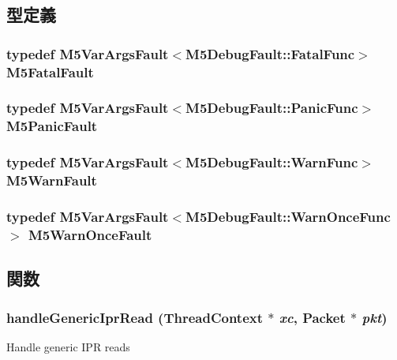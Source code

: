 \subsection{型定義}
\hypertarget{namespaceGenericISA_a7eadd3e78154f25c430d19d74ac7eb0c}{
\subsubsection[{M5FatalFault}]{\setlength{\rightskip}{0pt plus 5cm}typedef {\bf M5VarArgsFault}$<$M5DebugFault::FatalFunc$>$ {\bf M5FatalFault}}}
\label{namespaceGenericISA_a7eadd3e78154f25c430d19d74ac7eb0c}
\hypertarget{namespaceGenericISA_a3427cc78f489a7ee730b871fcb4c1960}{
\subsubsection[{M5PanicFault}]{\setlength{\rightskip}{0pt plus 5cm}typedef {\bf M5VarArgsFault}$<$M5DebugFault::PanicFunc$>$ {\bf M5PanicFault}}}
\label{namespaceGenericISA_a3427cc78f489a7ee730b871fcb4c1960}
\hypertarget{namespaceGenericISA_ad2999c164328ac8e86d95c538d694132}{
\subsubsection[{M5WarnFault}]{\setlength{\rightskip}{0pt plus 5cm}typedef {\bf M5VarArgsFault}$<$M5DebugFault::WarnFunc$>$ {\bf M5WarnFault}}}
\label{namespaceGenericISA_ad2999c164328ac8e86d95c538d694132}
\hypertarget{namespaceGenericISA_ae33236ed5f8a96d7a8c02ad15024384a}{
\subsubsection[{M5WarnOnceFault}]{\setlength{\rightskip}{0pt plus 5cm}typedef {\bf M5VarArgsFault}$<$M5DebugFault::WarnOnceFunc$>$ {\bf M5WarnOnceFault}}}
\label{namespaceGenericISA_ae33236ed5f8a96d7a8c02ad15024384a}


\subsection{関数}
\hypertarget{namespaceGenericISA_ac1de480955fd7b1b8b658e4faaece886}{
\subsubsection[{handleGenericIprRead}]{ handleGenericIprRead ({\bf ThreadContext} $\ast$ {\em xc}, \/  {\bf Packet} $\ast$ {\em pkt})}}
\label{namespaceGenericISA_ac1de480955fd7b1b8b658e4faaece886}
Handle generic IPR reads


